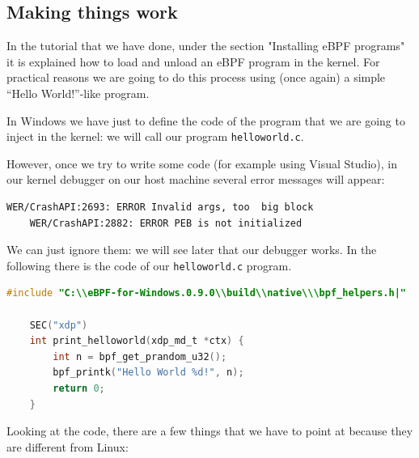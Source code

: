 \subsection{Making things work}

In the tutorial that we have done, under the section "Installing eBPF programs" it is explained how to load and unload an eBPF program in the kernel.
For practical reasons we are going to do this process using (once again) a simple ``Hello World!''-like program.

In Windows we have just to define the code of the program that we are going to inject in the kernel: we will call our program \colorbox{backcolour}{\lstinline[style=commandline, language=bash]|helloworld.c|}.

However, once we try to write some code (for example using Visual Studio), in our kernel debugger on our host machine several error messages will appear:

\begin{lstlisting}[style=commandline, language=bash, caption={Kernel debugger error messages}]
	WER/CrashAPI:2693: ERROR Invalid args, too  big block
	WER/CrashAPI:2882: ERROR PEB is not initialized
\end{lstlisting}

We can just ignore them: we will see later that our debugger works.
In the following there is the code of our \colorbox{backcolour}{\lstinline[style=commandline, language=bash]|helloworld.c|} program.

\begin{lstlisting}[style=cstyle, language=C, caption={``Hello world!'' kernel side program on Windows}, title=helloworld.c]
	#include "C:\\eBPF-for-Windows.0.9.0\\build\\native\\\bpf_helpers.h|"
	
	SEC("xdp")
	int print_helloworld(xdp_md_t *ctx) {
		int n = bpf_get_prandom_u32();
		bpf_printk("Hello World %d!", n);
		return 0;
	}
\end{lstlisting}

Looking at the code, there are a few things that we have to point at because they are different from Linux:

